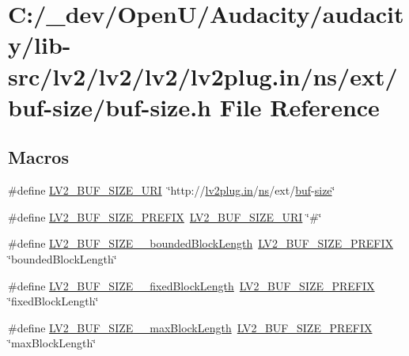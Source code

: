 \hypertarget{buf-size_8h}{}\section{C\+:/\+\_\+dev/\+Open\+U/\+Audacity/audacity/lib-\/src/lv2/lv2/lv2/lv2plug.in/ns/ext/buf-\/size/buf-\/size.h File Reference}
\label{buf-size_8h}
\subsection*{Macros}
\begin{DoxyCompactItemize}
\item 
\#define \hyperlink{buf-size_8h_a3a700d933b794162ea2a9c439d7f69ae}{L\+V2\+\_\+\+B\+U\+F\+\_\+\+S\+I\+Z\+E\+\_\+\+U\+RI}~\char`\"{}http\+://\hyperlink{latency_8c_a7d946209d777cb95fe30364b8d321207}{lv2plug.\+in}/\hyperlink{xmltok_8c_ab6aec1346fb6c7b2733f0f73c9536ad2}{ns}/ext/\hyperlink{xlstr_8c_a781718f5b53a876fe91c424c4607fa8f}{buf}-\/\hyperlink{group__lavu__mem_ga854352f53b148adc24983a58a1866d66}{size}\char`\"{}
\item 
\#define \hyperlink{buf-size_8h_a64096fada3412e9a580cc070d6dfba9b}{L\+V2\+\_\+\+B\+U\+F\+\_\+\+S\+I\+Z\+E\+\_\+\+P\+R\+E\+F\+IX}~\hyperlink{buf-size_8h_a3a700d933b794162ea2a9c439d7f69ae}{L\+V2\+\_\+\+B\+U\+F\+\_\+\+S\+I\+Z\+E\+\_\+\+U\+RI} \char`\"{}\#\char`\"{}
\item 
\#define \hyperlink{buf-size_8h_ae6b296269312d108c3b1bc15ed03942c}{L\+V2\+\_\+\+B\+U\+F\+\_\+\+S\+I\+Z\+E\+\_\+\+\_\+bounded\+Block\+Length}~\hyperlink{buf-size_8h_a64096fada3412e9a580cc070d6dfba9b}{L\+V2\+\_\+\+B\+U\+F\+\_\+\+S\+I\+Z\+E\+\_\+\+P\+R\+E\+F\+IX} \char`\"{}bounded\+Block\+Length\char`\"{}
\item 
\#define \hyperlink{buf-size_8h_a059909f9e27431fae22d2cfeb7029919}{L\+V2\+\_\+\+B\+U\+F\+\_\+\+S\+I\+Z\+E\+\_\+\+\_\+fixed\+Block\+Length}~\hyperlink{buf-size_8h_a64096fada3412e9a580cc070d6dfba9b}{L\+V2\+\_\+\+B\+U\+F\+\_\+\+S\+I\+Z\+E\+\_\+\+P\+R\+E\+F\+IX} \char`\"{}fixed\+Block\+Length\char`\"{}
\item 
\#define \hyperlink{buf-size_8h_abe5cfaa4a0ac9fc7f6963fac7fd2d1a2}{L\+V2\+\_\+\+B\+U\+F\+\_\+\+S\+I\+Z\+E\+\_\+\+\_\+max\+Block\+Length}~\hyperlink{buf-size_8h_a64096fada3412e9a580cc070d6dfba9b}{L\+V2\+\_\+\+B\+U\+F\+\_\+\+S\+I\+Z\+E\+\_\+\+P\+R\+E\+F\+IX} \char`\"{}max\+Block\+Length\char`\"{}

\end{DoxyCompactItemize}
